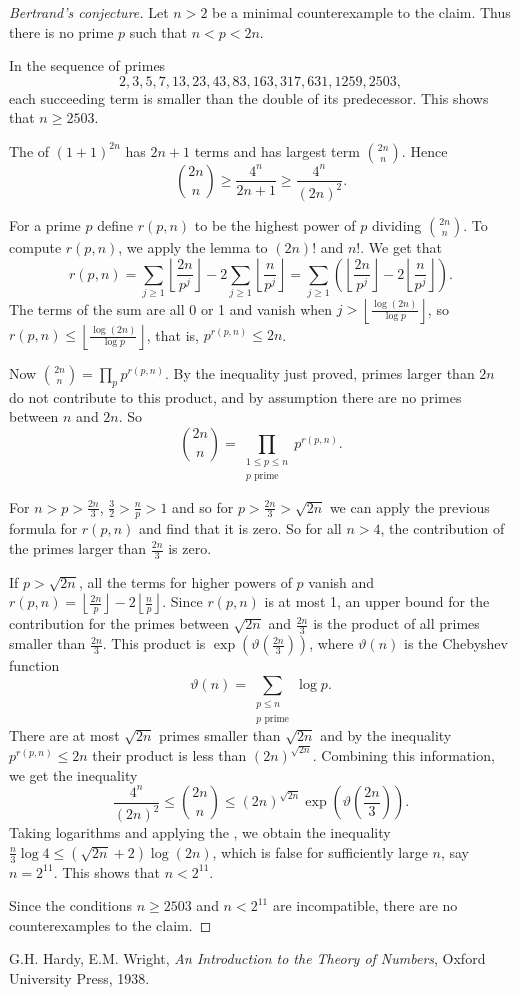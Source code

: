 \documentclass[12pt]{article}
\begin{document}
\begin{proof}[Bertrand's conjecture]
Let $n>2$ be a minimal counterexample to the claim. Thus there is no prime $p$ such that $n<p<2n$.

In the sequence of primes
\[
2, 3, 5, 7, 13, 23, 43, 83, 163, 317, 631, 1259, 2503,
\]
each succeeding term is smaller than the double of its predecessor.  This shows
that $n\ge 2503$.

The  of $(1+1)^{2n}$ has $2n+1$ terms and has largest term $\binom{2n}{n}$.  Hence 
\[
\binom{2n}{n}\ge\frac{4^n}{2n+1}\ge\frac{4^n}{(2n)^2}.
\]

For a prime $p$ define $r(p,n)$ to be the highest power of $p$ dividing $\binom{2n}{n}$.  To compute $r(p,n)$, we apply the lemma to $(2n)!$ and $n!$.  We get that
\[
r(p,n)=\sum_{j\ge 1}\left\lfloor\frac{2n}{p^j}\right\rfloor
-2\sum_{j\ge 1}\left\lfloor\frac{n}{p^j}\right\rfloor
=\sum_{j\ge 1}\left(\left\lfloor\frac{2n}{p^j}\right\rfloor
-2\left\lfloor\frac{n}{p^j}\right\rfloor\right).
\]
The terms of the sum are all 0 or 1 and vanish when
$\displaystyle j>\left\lfloor\frac{\log(2n)}{\log p}\right\rfloor$, so
$\displaystyle r(p,n)\le\left\lfloor\frac{\log(2n)}{\log p}\right\rfloor$, that is,
$p^{r(p,n)}\le 2n$.

Now $\displaystyle\binom{2n}{n}=\prod_p p^{r(p,n)}$. By the inequality just proved, primes larger than $2n$ do not contribute to this product, and by assumption there are no primes between $n$ and $2n$. So
\[
\binom{2n}{n}=\prod_{\substack{1\le p \le n\\ p\text{\ prime}}}p^{r(p,n)}.
\]

For $n>p>\frac{2n}{3}$, $\frac{3}{2}>\frac{n}{p}>1$ and so for $p>\frac{2n}{3}>\sqrt{2n}$ we can apply the previous formula for $r(p,n)$ and find that it is zero. So for all $n>4$, the contribution of the primes larger than $\frac{2n}{3}$ is zero.

If $p>\sqrt{2n}$, all the terms for higher powers of $p$ vanish and $\displaystyle r(p,n)=\left\lfloor\frac{2n}{p}\right\rfloor-2\left\lfloor\frac{n}{p}\right\rfloor$.
Since $r(p,n)$ is at most 1, an upper bound for the
contribution for the primes between $\sqrt{2n}$ and $\frac{2n}{3}$ is the product of all primes smaller than $\frac{2n}{3}$.  This product is
$\exp\left(\vartheta(\frac{2n}{3})\right)$, where $\vartheta(n)$ is the Chebyshev function
\[
\vartheta(n)=\sum_{\substack{p\le n\\p\text{\ prime}}}\log p.
\]
There are at most $\sqrt{2n}$ primes smaller than $\sqrt{2n}$ and by the inequality $p^{r(p,n)}\le 2n$ their product is less than
$(2n)^{\sqrt{2n}}$.  Combining this information, we get the inequality
\[
\frac{4^n}{(2n)^2}\le\binom{2n}{n}\le(2n)^{\sqrt{2n}}\exp\left({\textstyle\vartheta(\frac{2n}{3})}\right).
\]
Taking logarithms and applying the , we obtain the inequality $\frac{n}{3}\log 4\le(\sqrt{2n}+2)\log(2n)$, which is false for sufficiently large $n$, say $n=2^{11}$.  This shows that $n<2^{11}$.

Since the conditions $n\ge 2503$ and $n<2^{11}$ are incompatible, there are no counterexamples to the claim.
\end{proof}

\begin{thebibliography}{9}
G.H. Hardy, E.M. Wright, \emph{An Introduction to the Theory of Numbers}, Oxford University Press, 1938.
\end{thebibliography}

\end{document}
